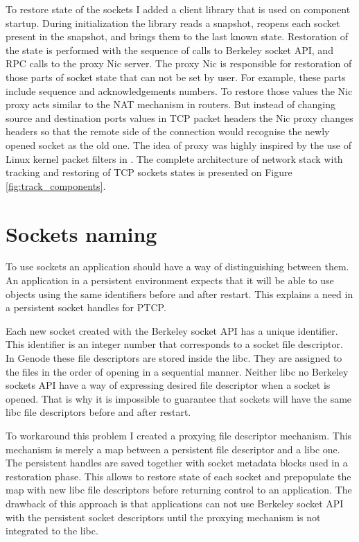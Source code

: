 To restore state of the sockets I added a client library that is used on
component startup. During initialization the library reads a snapshot, reopens
each socket present in the snapshot, and brings them to the last known state.
Restoration of the state is performed with the sequence of calls to Berkeley
socket API, and RPC calls to the proxy Nic server. The proxy Nic is responsible
for restoration of those parts of socket state that can not be set by user. For
example, these parts include sequence and acknowledgements numbers. To restore
those values the Nic proxy acts similar to the NAT mechanism in routers. But 
instead of changing source and destination ports values in TCP packet headers
the Nic proxy changes headers so that the remote side of the connection would
recognise the newly opened socket as the old one. The idea of proxy was highly
inspired by the use of Linux kernel packet filters in \cite{rocks_racks}. The
complete architecture of network stack with tracking and restoring of TCP
sockets states is presented on Figure \ref{fig:track_components}.

\section{Sockets naming}

To use sockets an application should have a way of distinguishing between them.
An application in a persistent environment expects that it will be able to use
objects using the same identifiers before and after restart. This explains a
need in a persistent socket handles for PTCP.

Each new socket created with the Berkeley socket API has a unique identifier.
This identifier is an integer number that corresponds to a socket file
descriptor. In Genode these file descriptors are stored inside the libc. They
are assigned to the files in the order of opening in a sequential manner.
Neither libc no Berkeley sockets API have a way of expressing desired file
descriptor when a socket is opened. That is why it is impossible to guarantee
that sockets will have the same libc file descriptors before and after restart.

To workaround this problem I created a proxying file descriptor mechanism. This
mechanism is merely a map between a persistent file descriptor and a libc one.
The persistent handles are saved together with socket metadata blocks used in a
restoration phase. This allows to restore state of each socket and prepopulate
the map with new libc file descriptors before returning control to an
application. The drawback of this approach is that applications can not use
Berkeley socket API with the persistent socket descriptors until the proxying
mechanism is not integrated to the libc.


